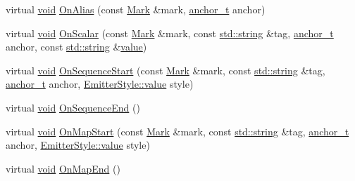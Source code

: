 \begin{DoxyCompactItemize}
\item 
virtual \mbox{\hyperlink{glad_8h_a950fc91edb4504f62f1c577bf4727c29}{void}} \mbox{\hyperlink{class_y_a_m_l_1_1_node_builder_a4d4b147301ef0a70bd3e09ccdb5a7a30}{On\+Alias}} (const \mbox{\hyperlink{struct_y_a_m_l_1_1_mark}{Mark}} \&mark, \mbox{\hyperlink{namespace_y_a_m_l_abeff1798814ae3402fc5665fdcad1de6}{anchor\+\_\+t}} anchor)
\item 
virtual \mbox{\hyperlink{glad_8h_a950fc91edb4504f62f1c577bf4727c29}{void}} \mbox{\hyperlink{class_y_a_m_l_1_1_node_builder_a433706a6b7ef7fbca180af1e4b83f2b9}{On\+Scalar}} (const \mbox{\hyperlink{struct_y_a_m_l_1_1_mark}{Mark}} \&mark, const \mbox{\hyperlink{glad_8h_ac83513893df92266f79a515488701770}{std\+::string}} \&tag, \mbox{\hyperlink{namespace_y_a_m_l_abeff1798814ae3402fc5665fdcad1de6}{anchor\+\_\+t}} anchor, const \mbox{\hyperlink{glad_8h_ac83513893df92266f79a515488701770}{std\+::string}} \&\mbox{\hyperlink{glad_8h_a03aff08f73d7fde3d1a08e0abd8e84fa}{value}})
\item 
virtual \mbox{\hyperlink{glad_8h_a950fc91edb4504f62f1c577bf4727c29}{void}} \mbox{\hyperlink{class_y_a_m_l_1_1_node_builder_aa69f5009a6cc939b063c1041be30ceb7}{On\+Sequence\+Start}} (const \mbox{\hyperlink{struct_y_a_m_l_1_1_mark}{Mark}} \&mark, const \mbox{\hyperlink{glad_8h_ac83513893df92266f79a515488701770}{std\+::string}} \&tag, \mbox{\hyperlink{namespace_y_a_m_l_abeff1798814ae3402fc5665fdcad1de6}{anchor\+\_\+t}} anchor, \mbox{\hyperlink{struct_y_a_m_l_1_1_emitter_style_ae86640662c85ce6062a37f9636b6959f}{Emitter\+Style\+::value}} style)
\item 
virtual \mbox{\hyperlink{glad_8h_a950fc91edb4504f62f1c577bf4727c29}{void}} \mbox{\hyperlink{class_y_a_m_l_1_1_node_builder_ae699f0db4856fd954120ea3dd5d3b839}{On\+Sequence\+End}} ()
\item 
virtual \mbox{\hyperlink{glad_8h_a950fc91edb4504f62f1c577bf4727c29}{void}} \mbox{\hyperlink{class_y_a_m_l_1_1_node_builder_a8afef9632f64f0d91113a28db10b5217}{On\+Map\+Start}} (const \mbox{\hyperlink{struct_y_a_m_l_1_1_mark}{Mark}} \&mark, const \mbox{\hyperlink{glad_8h_ac83513893df92266f79a515488701770}{std\+::string}} \&tag, \mbox{\hyperlink{namespace_y_a_m_l_abeff1798814ae3402fc5665fdcad1de6}{anchor\+\_\+t}} anchor, \mbox{\hyperlink{struct_y_a_m_l_1_1_emitter_style_ae86640662c85ce6062a37f9636b6959f}{Emitter\+Style\+::value}} style)
\item 
virtual \mbox{\hyperlink{glad_8h_a950fc91edb4504f62f1c577bf4727c29}{void}} \mbox{\hyperlink{class_y_a_m_l_1_1_node_builder_af6eee8daf61700c793e4e03acc49caf9}{On\+Map\+End}} ()
\end{DoxyCompactItemize}


